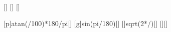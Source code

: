 [\mpss]
[\percent]
[\m]

[\arctan p]{atan(\stgX/100)*180/pi}[\degree]
[g\sin\alpha]{\gEX*sin(\wiX*pi/180)}[\mpss]
[]{sqrt(2*\sStX/\aAuX)}[\s]
[]{\aAuX*\tAuX}[\mps]
